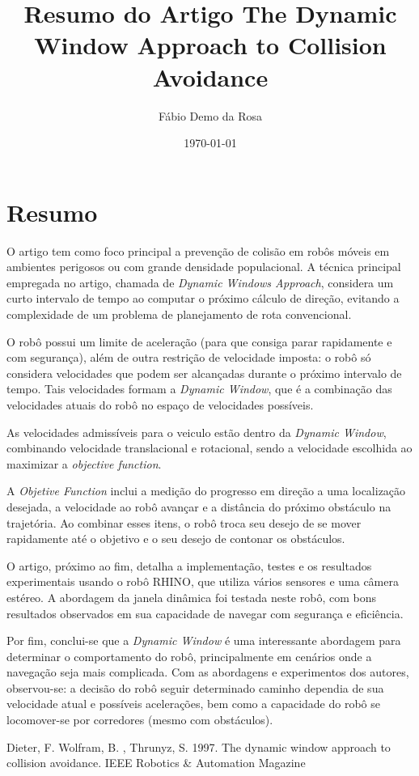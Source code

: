 \documentclass[12pt, a4paper]{article}
\begin{document}
\title{Resumo do Artigo The Dynamic Window Approach to Collision Avoidance}
\author{Fábio Demo da Rosa}
\date{\today}

\maketitle

\section*{Resumo}
	O artigo tem como foco principal a prevenção de colisão em robôs móveis em ambientes perigosos ou com grande densidade populacional.
	A técnica principal empregada no artigo, chamada de \textit{Dynamic Windows Approach}, considera um curto intervalo de tempo ao computar o próximo cálculo de direção, evitando a complexidade de um problema de planejamento de rota convencional.

	O robô possui um limite de aceleração (para que consiga parar rapidamente e com segurança), além de outra restrição de velocidade imposta: o robô só considera velocidades que podem ser alcançadas durante o próximo intervalo de tempo. 
	Tais velocidades formam a \textit{Dynamic Window}, que é a combinação das velocidades atuais do robô no espaço de velocidades possíveis.

	As velocidades admissíveis para o veiculo estão dentro da \textit{Dynamic Window}, combinando velocidade translacional e rotacional, sendo a velocidade escolhida ao maximizar a \textit{objective function}. 
	
	A \textit{Objetive Function} inclui a medição do progresso em direção a uma localização desejada, a velocidade ao robô avançar e a distância do próximo obstáculo na trajetória.
	Ao combinar esses itens, o robô troca seu desejo de se mover rapidamente até o objetivo e o seu desejo de contonar os obstáculos.

	O artigo, próximo ao fim, detalha a implementação, testes e os resultados experimentais usando o robô RHINO, que utiliza vários sensores e uma câmera estéreo. A abordagem da janela dinâmica foi testada neste robô, com bons resultados observados em sua capacidade de navegar com segurança e eficiência.

	Por fim, conclui-se que a \textit{Dynamic Window} é uma interessante abordagem para determinar o comportamento do robô, principalmente em cenários onde a navegação seja mais complicada. Com as abordagens e experimentos dos autores, observou-se: a decisão do robô seguir determinado caminho dependia de sua velocidade atual e possíveis acelerações, bem como a capacidade do robô se locomover-se por corredores (mesmo com obstáculos).

	\begin{thebibliography}{2}

		 Dieter, F. Wolfram, B. , Thrunyz, S. 1997. The dynamic window approach to collision avoidance. IEEE Robotics \& Automation Magazine
		
		\end{thebibliography}
		
	
\end{document}
